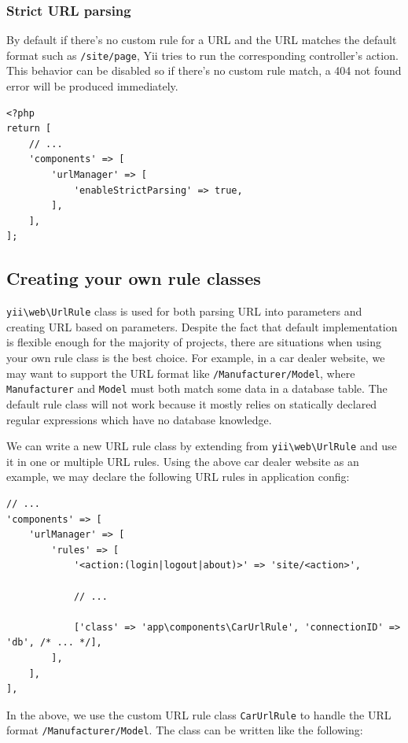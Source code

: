 \subsubsection{Strict URL parsing}
By default if there's no custom rule for a URL and the URL matches the default format such as \lstinline|/site/page|, Yii tries to run the corresponding controller's action. This behavior can be disabled so if there's no custom rule match, a 404 not found error will be produced immediately.

\lstset{language=php}\begin{lstlisting}
<?php
return [
    // ...
    'components' => [
        'urlManager' => [
            'enableStrictParsing' => true,
        ],
    ],
];
\end{lstlisting}
\subsection{Creating your own rule classes}
\texttt{yii{\allowbreak{}\textbackslash}web{\allowbreak{}\textbackslash}UrlRule} class is used for both parsing URL into parameters and creating URL based on parameters. Despite
the fact that default implementation is flexible enough for the majority of projects, there are situations when using
your own rule class is the best choice. For example, in a car dealer website, we may want to support the URL format like
\lstinline|/Manufacturer/Model|, where \lstinline|Manufacturer| and \lstinline|Model| must both match some data in a database table. The default rule
class will not work because it mostly relies on statically declared regular expressions which have no database knowledge.

We can write a new URL rule class by extending from \texttt{yii{\allowbreak{}\textbackslash}web{\allowbreak{}\textbackslash}UrlRule} and use it in one or multiple URL rules. Using
the above car dealer website as an example, we may declare the following URL rules in application config:

\lstset{language=php}\begin{lstlisting}
// ...
'components' => [
    'urlManager' => [
        'rules' => [
            '<action:(login|logout|about)>' => 'site/<action>',

            // ...

            ['class' => 'app\components\CarUrlRule', 'connectionID' => 'db', /* ... */],
        ],
    ],
],
\end{lstlisting}
In the above, we use the custom URL rule class \lstinline|CarUrlRule| to handle
the URL format \lstinline|/Manufacturer/Model|. The class can be written like the following:

